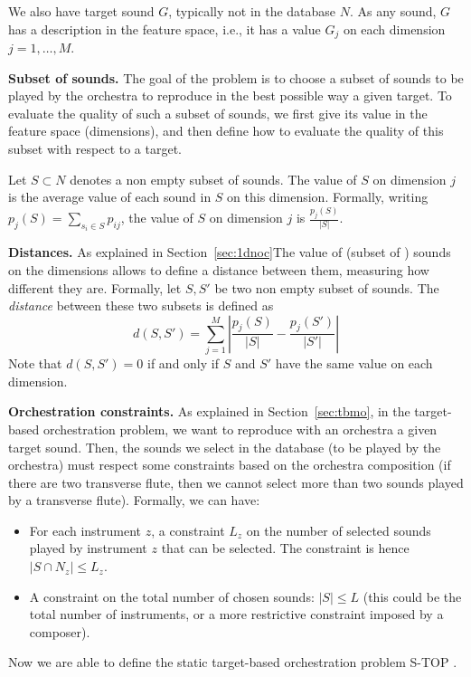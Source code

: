 \documentclass[a4paper]{book}
\newcommand{\stat}{{\sc S-TOP }}
\begin{document}
We also have  target sound $G$, typically not in the database $N$. As any sound, $G$ has a description in the feature space, i.e., it has a value $G_j$ on each dimension $j=1,\dots,M$.

{\bf Subset of sounds.} The goal of the problem is to choose a subset of sounds to be played by the orchestra to reproduce in the best possible way a given target. To evaluate the quality of such a subset of sounds, we first give its value in the feature space (dimensions), and then define how to evaluate the quality of this subset with respect to a target. 

Let $S\subset N$ denotes a non empty subset of sounds. The value of $S$ on dimension $j$ is the average value of each sound in $S$ on this dimension. Formally, writing $p_j(S)=\sum_{s_i\in S}p_{ij}$, the value of $S$ on dimension $j$ is $\frac{p_j(S)}{|S|}$. 

{\bf Distances.} As explained in Section~\ref{sec:1dnoc}The value of (subset of ) sounds on the dimensions allows to define a distance between them, measuring how different they are. Formally, let $S,S'$ be two non empty subset of sounds. The {\it distance} between these two subsets is defined as $$d(S,S')=\sum_{j=1}^M \left| \frac{p_j(S)}{|S|} - \frac{p_j(S')}{|S'|}\right|$$
Note that $d(S,S')=0$ if and only if $S$ and $S'$ have the same value on each dimension.

{\bf Orchestration constraints.} As explained in Section~\ref{sec:tbmo}, in the target-based orchestration problem, we want to reproduce with an orchestra a given target sound. Then, the sounds we select in the database (to be played by the orchestra) must respect some constraints based on the orchestra composition (if there are two transverse flute, then we cannot select more than two sounds played by a transverse flute). Formally, we can have:
\begin{itemize}
    \item For each instrument $z$, a constraint $L_z$ on the number of selected sounds played by instrument $z$ that can be selected. The constraint is hence $|S\cap N_z|\leq L_z$.
    \item A constraint on the total number of chosen sounds: $|S|\leq L$ (this could be the total number of instruments, or a more restrictive constraint imposed by a composer).
\end{itemize}


Now we are able to define the static target-based orchestration problem \stat.
\end{document}
